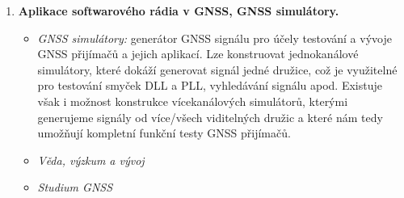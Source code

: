 \documentclass[11pt,a4paper]{article}
\begin{document}
\begin{enumerate}
    \item \textbf{Aplikace softwarového rádia v GNSS, GNSS simulátory.}
    \begin{itemize}
        \item \emph{GNSS simulátory:} generátor GNSS signálu pro účely testování a vývoje GNSS přijímačů a jejich aplikací. Lze konstruovat jednokanálové simulátory, které dokáží generovat signál jedné družice, což je využitelné pro testování smyček DLL a PLL, vyhledávání signálu apod. Existuje však i možnost konstrukce vícekanálových simulátorů, kterými generujeme signály od více/všech viditelných družic a které nám tedy umožňují kompletní funkční testy GNSS přijímačů.
        \item \emph{Věda, výzkum a vývoj} 
        \item \emph{Studium GNSS} 
    \end{itemize}
    

\end{enumerate}
\end{document}

